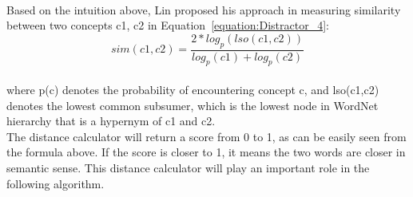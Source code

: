 \\
Based on the intuition above, Lin proposed his approach in measuring similarity between two concepts c1, c2 in Equation~\ref{equation:Distractor_4}:
\\
\begin{equation}
sim(c1,c2) = \frac{2*log_p(lso(c1,c2))}{log_p(c1)+log_p(c2)}
\label{equation:Distractor_4}
\end{equation}  
\\
where p(c) denotes the probability of encountering concept c, and lso(c1,c2) denotes the lowest common subsumer, which is the lowest node in WordNet hierarchy that is a hypernym of c1 and c2. 
\\
The distance calculator will return a score from 0 to 1, as can be easily seen from the formula above. If the score is closer to 1, it means the two words are closer in semantic sense. This distance calculator will play an important role in the following algorithm. 
\\
